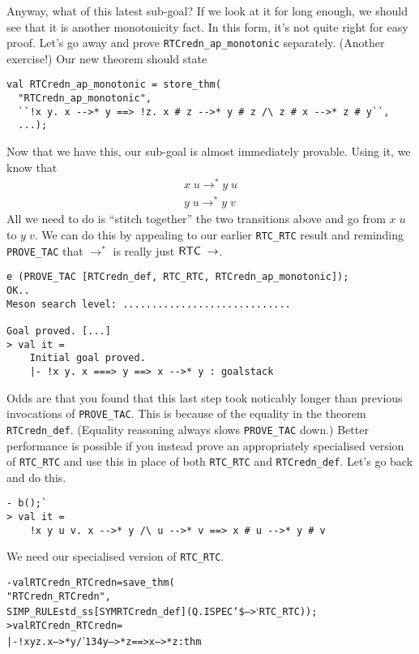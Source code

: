 \documentclass[12pt]{article}
\newcommand{\bk}{\char'134}
\begin{document}
    Anyway, what of this latest sub-goal?  If we look at it for long
    enough, we should see that it is another monotonicity fact.  In
    this form, it's not quite right for easy proof.  Let's go away and
    prove \texttt{RTCredn\_ap\_monotonic} separately. (Another
    exercise!)  Our new theorem should state
\begin{session}\begin{verbatim}
val RTCredn_ap_monotonic = store_thm(
  "RTCredn_ap_monotonic",
  ``!x y. x -->* y ==> !z. x # z -->* y # z /\ z # x -->* z # y``,
  ...);
\end{verbatim}\end{session}
    Now that we have this, our sub-goal is almost immediately
    provable.  Using it, we know that \[\begin{array}{c}
      x\;u \rightarrow^* y\;u \\
      y\;u \rightarrow^* y\;v
    \end{array}\]
    All we need to do is ``stitch together'' the two transitions above
    and go from $x\;u$ to $y\;v$.  We can do this by appealing to our
    earlier \texttt{RTC\_RTC} result and reminding \texttt{PROVE\_TAC}
    that $\rightarrow^*$ is really just
    ${\sf RTC}\;\rightarrow$.
\begin{session}\begin{verbatim}
e (PROVE_TAC [RTCredn_def, RTC_RTC, RTCredn_ap_monotonic]);
OK..
Meson search level: .............................

Goal proved. [...]
> val it =
    Initial goal proved.
    |- !x y. x ===> y ==> x -->* y : goalstack
\end{verbatim}\end{session}
Odds are that you found that this last step took noticably longer than
previous invocations of \texttt{PROVE\_TAC}.  This is because of the
equality in the theorem \texttt{RTCredn\_def}.  (Equality reasoning
always slows \texttt{PROVE\_TAC} down.) Better performance is possible
if you instead prove an appropriately specialised version of
\texttt{RTC\_RTC} and use this in place of both \texttt{RTC\_RTC} and
\texttt{RTCredn\_def}.  Let's go back and do this.
\begin{session}\begin{verbatim}
- b();`
> val it =
    !x y u v. x -->* y /\ u -->* v ==> x # u -->* y # v
\end{verbatim}\end{session}
We need our specialised version of \texttt{RTC\_RTC}.
\begin{session}\begin{alltt}
- val RTCredn_RTCredn = save_thm(
    "RTCredn_RTCredn",
    SIMP_RULE std_ss [SYM RTCredn_def] (Q.ISPEC `\$-->` RTC_RTC));
> val RTCredn_RTCredn =
    |- !x y z. x -->* y /\bk{} y -->* z ==> x -->* z : thm
\end{alltt}\end{session}
\end{document}
